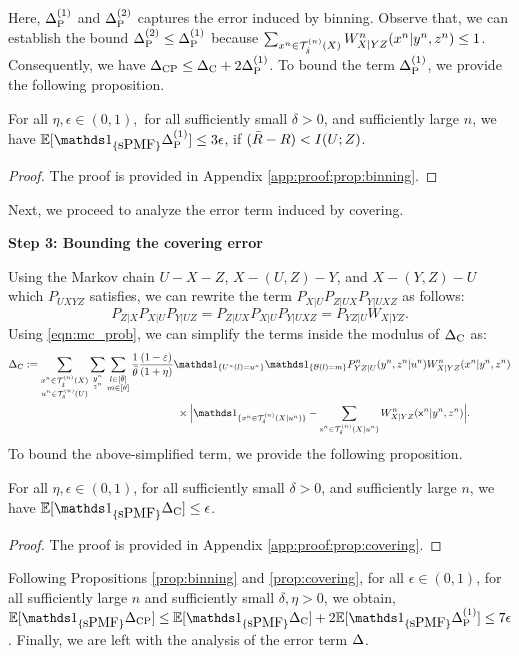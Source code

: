 Here, $\Delta_{\text{P}}^{(1)}$ and $\Delta_{\text{P}}^{(2)}$ captures the error induced by binning. Observe that, we can establish the bound $\Delta_{\text{P}}^{(2)} \leq \Delta_{\text{P}}^{(1)}$ because $\sum_{x^n \in \mathcal{T}_{\hat{\delta}}^{(n)}({X})} W^n_{X|YZ}(x^n|y^n,z^n) \leq 1$. Consequently, we have $\Delta_{\text{CP}} \leq \Delta_{\text{C}} + 2\Delta_{\text{P}}^{(1)}$. To bound the term $\Delta_{\text{P}}^{(1)}$, we provide the following proposition.
\begin{proposition}\label{prop:binning} For all $\eta,\epsilon \in (0,1),$ for all sufficiently small $\delta >0$, and sufficiently large $n$, we have $\EE[\Ipmf \peone] \leq 3\epsilon$, if $(\bar{R}-R) < I(U;Z)$.
\end{proposition}
\begin{proof}
The proof is provided in Appendix \ref{app:proof:prop:binning}.
\end{proof} 
\noindent Next, we proceed to analyze the error term induced by covering. 

\noindent\textbf{Step 3: Bounding the covering error}

\noindent Using the Markov chain $U-X-Z$, $X-(U,Z)-Y$, and $X-(Y,Z)-U$ which $P_{UXYZ}$ satisfies, we can rewrite the term $ P_{X|U} P_{Z|UX} P_{Y|UXZ}$ as follows:
\begin{equation}\label{eqn:mc_prob}
    P_{Z|X} P_{X|U} P_{Y|UZ} = P_{Z|UX} P_{X|U} P_{Y|UXZ} = P_{YZ|U} W_{X|YZ}.
\end{equation}
Using \eqref{eqn:mc_prob}, we can simplify the terms inside the modulus of $\Delta_{\text{C}}$ as:
\begin{align*}
    \ce &\deq \sum_{\substack{\xn \in \Tx \\ \un \in \Tu }} \sum_{\substack{\yn \\ \zn}} \sum_{\substack{ l \in [\btheta]\\m\in [\theta] }} 
    \frac{1}{\btheta} \frac{(1-\varepsilon)}{(1+\eta)} 
    \I_{\set{\Un(l) = \un}} \I_{\set{\calB(l) = m}} P_{YZ|U}^n(\yn,\zn|\un) W^n_{X|YZ}(\xn|\yn,\zn) \\
    & \hspace{2in} \times \Big|\I_{\set{\xn \in \Txcond}} - \sum_{\substack{\sfxn \in \Txcond}} W^n_{X|YZ}(\sfxn
    |\yn,\zn)
    \Big|.
\end{align*}
To bound the above-simplified term, we provide the following proposition. 
\begin{proposition}\label{prop:covering}
    For all $\eta, \epsilon \in (0,1)$, for all sufficiently small $\delta >0$, and sufficiently large $n$, we have $\EE[\Ipmf \ce] \leq \epsilon$.
\end{proposition}
\begin{proof}
The proof is provided in Appendix \ref{app:proof:prop:covering}.
\end{proof}
Following Propositions \ref{prop:binning} and \ref{prop:covering}, for all $\epsilon \in (0,1)$, for all sufficiently large $n$ and sufficiently small $\delta, \eta> 0$, we obtain, $\EE[\Ipmf \cpe] \leq \EE[\Ipmf \ce] + 2\EE[\Ipmf \peone] \leq 7\epsilon$.  Finally, we are left with the analysis of the error term ${\Delta}$.

